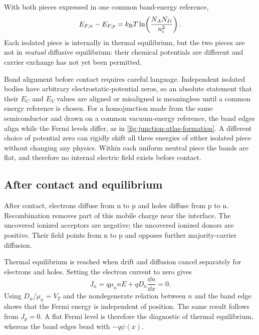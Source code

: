 With both pieces expressed in one common band-energy reference,
\begin{equation}
 E_{F,n}-E_{F,p}
 =k_{\mathrm B} T\ln\!\left(\frac{N_A N_D}{n_i^2}\right).
 \label{eq:pn-isolated-fermi-separation}
\end{equation}
Each isolated piece is internally in thermal equilibrium, but the two pieces
are not in \emph{mutual} diffusive equilibrium: their chemical potentials
are different and carrier exchange has not yet been permitted.

Band alignment before contact requires careful language.  Independent isolated
bodies have arbitrary electrostatic-potential zeros, so an absolute statement
that their $E_C$ and $E_V$ values are aligned or misaligned is meaningless
until a common energy reference is chosen.  For a homojunction made from the
same semiconductor and drawn on a common vacuum-energy reference, the band
edges align while the Fermi levels differ, as in
\cref{fig:junction-atlas-formation}.  A different choice of potential zero can
rigidly shift all three energies of either isolated piece without changing any
physics.  Within each uniform neutral piece the bands are flat, and therefore
no internal electric field exists before contact.

\subsection{After contact and equilibrium}

After contact, electrons diffuse from n to p and holes diffuse from p to n.
Recombination removes part of this mobile charge near the interface.  The
uncovered ionized acceptors are negative; the uncovered ionized donors are
positive.  Their field points from n to p and opposes further majority-carrier
diffusion.

Thermal equilibrium is reached when drift and diffusion cancel separately for
electrons and holes.  Setting the electron current to zero gives
\begin{equation}
  J_n=q\mu_n nE+qD_n\frac{\dd n}{\dd x}=0.
  \label{eq:pn-equilibrium-electron-current}
\end{equation}
Using $D_n/\mu_n=V_T$ and the nondegenerate relation between $n$ and the band
edge shows that the Fermi energy is independent of position.  The same result
follows from $J_p=0$.  A flat Fermi level is therefore the diagnostic of
thermal equilibrium, whereas the band edges bend with $-q\psi(x)$.

